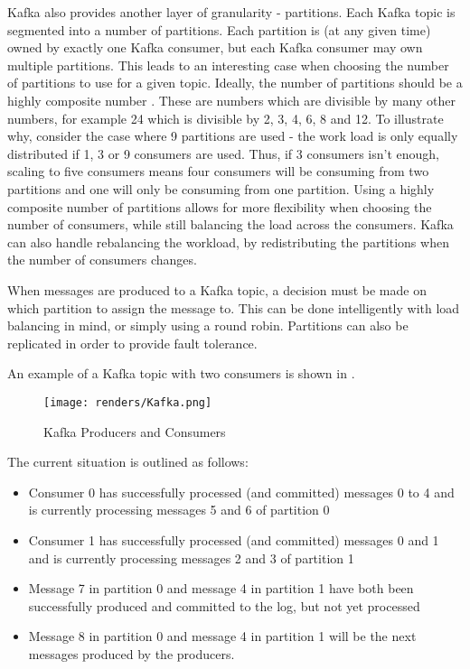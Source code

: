 Kafka also provides another layer of granularity - partitions. Each Kafka topic is segmented into a number of partitions. Each partition is (at any given time) owned by exactly one Kafka consumer, but each Kafka consumer may own multiple partitions. This leads to an interesting case when choosing the number of partitions to use for a given topic. Ideally, the number of partitions should be a highly composite number \cite {highlyCompositeNumbers}. These are numbers which are divisible by many other numbers, for example 24 which is divisible by 2, 3, 4, 6, 8 and 12. To illustrate why, consider the case where 9 partitions are used - the work load is only equally distributed if 1, 3 or 9 consumers are used. Thus, if 3 consumers isn't enough, scaling to five consumers means four consumers will be consuming from two partitions and one will only be consuming from one partition. Using a highly composite number of partitions allows for more flexibility when choosing the number of consumers, while still balancing the load across the consumers. Kafka can also handle rebalancing the workload, by redistributing the partitions when the number of consumers changes. 

When messages are produced to a Kafka topic, a decision must be made on which partition to assign the message to. This can be done intelligently with load balancing in mind, or simply using a round robin. Partitions can also be replicated in order to provide fault tolerance.

An example of a Kafka topic with two consumers is shown in . 

\begin{figure}[H]
      \centering
      \texttt{[image: renders/Kafka.png]}
      \caption{Kafka Producers and Consumers}
      \label{fig:kafka}
\end{figure}  

The current situation is outlined as follows:
\begin{itemize}
\item{Consumer 0 has successfully processed (and committed) messages 0 to 4 and is currently processing messages 5 and 6 of partition 0}
\item{Consumer 1 has successfully processed (and committed) messages 0 and 1 and is currently processing messages 2 and 3 of partition 1}
\item{Message 7 in partition 0 and message 4 in partition 1 have both been successfully produced and committed to the log, but not yet processed}
\item{Message 8 in partition 0 and message 4 in partition 1 will be the next messages produced by the producers.}
\end{itemize}

